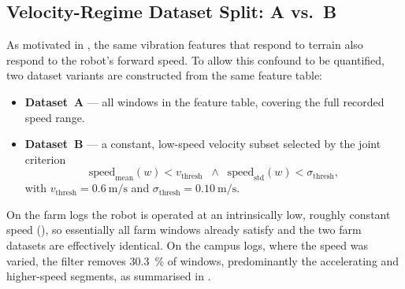 \subsection{Velocity-Regime Dataset Split: A vs.\ B}
\label{sec:feat_dataset_AB}

As motivated in , the same vibration features that respond to terrain also respond to the robot's forward speed. To allow this confound to be quantified, two dataset variants are constructed from the same feature table:
\begin{itemize}
    \item \textbf{Dataset~A} --- all windows in the feature table, covering the full recorded speed range.
    \item \textbf{Dataset~B} --- a constant, low-speed velocity subset selected by the joint criterion
          \begin{equation}
              \mathrm{speed}_{\mathrm{mean}}(w) < v_{\mathrm{thresh}}
              \;\;\land\;\;
              \mathrm{speed}_{\mathrm{std}}(w) < \sigma_{\mathrm{thresh}},
              \label{eq:dataset_B_mask}
          \end{equation}
          with $v_{\mathrm{thresh}} = \SI{0.6}{\meter\per\second}$ and $\sigma_{\mathrm{thresh}} = \SI{0.10}{\meter\per\second}$.
\end{itemize}
On the farm logs the robot is operated at an intrinsically low, roughly constant speed (), so essentially all farm windows already satisfy  and the two farm datasets are effectively identical. On the campus logs, where the speed was varied, the filter removes \SI{30.3}{\percent} of windows, predominantly the accelerating and higher-speed segments, as summarised in .

